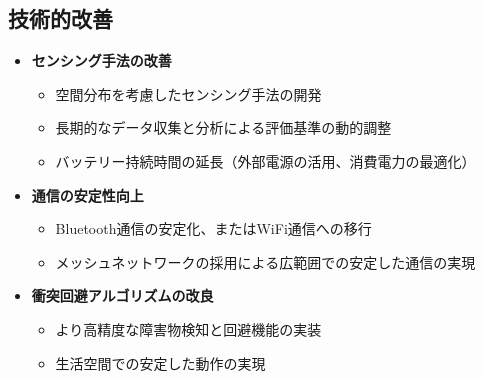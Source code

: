 \documentclass{cuxarticle}
\begin{document}
\subsection{技術的改善}
\begin{itemize}
  \item \textbf{センシング手法の改善}
    \begin{itemize}
      \item 空間分布を考慮したセンシング手法の開発
      \item 長期的なデータ収集と分析による評価基準の動的調整
      \item バッテリー持続時間の延長（外部電源の活用、消費電力の最適化）
    \end{itemize}

  \item \textbf{通信の安定性向上}
    \begin{itemize}
      \item Bluetooth通信の安定化、またはWiFi通信への移行
      \item メッシュネットワークの採用による広範囲での安定した通信の実現
    \end{itemize}

  \item \textbf{衝突回避アルゴリズムの改良}
    \begin{itemize}
      \item より高精度な障害物検知と回避機能の実装
      \item 生活空間での安定した動作の実現
    \end{itemize}
\end{itemize}
\end{document}
